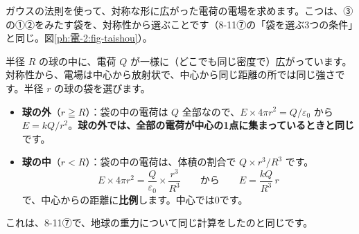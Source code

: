 \label{ph:電-2:sec4}
ガウスの法則を使って、対称な形に広がった電荷の電場を求めます。こつは、③の①②をみたす袋を、対称性から選ぶことです（8-11⑦の「袋を選ぶ3つの条件」と同じ。図\ref{ph:電-2:fig-taishou}）。


半径 $R$ の球の中に、電荷 $Q$ が一様に（どこでも同じ密度で）広がっています。対称性から、電場は中心から放射状で、中心から同じ距離の所では同じ強さです。半径 $r$ の球の袋を選びます。
\begin{itemize}[leftmargin=1.2\zw, itemsep=2pt, topsep=2pt, label={\color{bkTheme}●}]
\item \textbf{球の外}（$r\geqq R$）：袋の中の電荷は $Q$ 全部なので、$E\times4\pi r^2=Q/\varepsilon_0$ から $E=kQ/r^2$。\textbf{球の外では、全部の電荷が中心の1点に集まっているときと同じ}です。
\item \textbf{球の中}（$r<R$）：袋の中の電荷は、体積の割合で $Q\times r^3/R^3$ です。
\[E\times4\pi r^2=\frac{Q}{\varepsilon_0}\times\frac{r^3}{R^3}\qquad\text{から}\qquad E=\frac{kQ}{R^3}\,r\]
で、中心からの距離に\textbf{比例}します。中心では0です。
\end{itemize}
これは、8-11⑦で、地球の重力について同じ計算をしたのと同じです。

